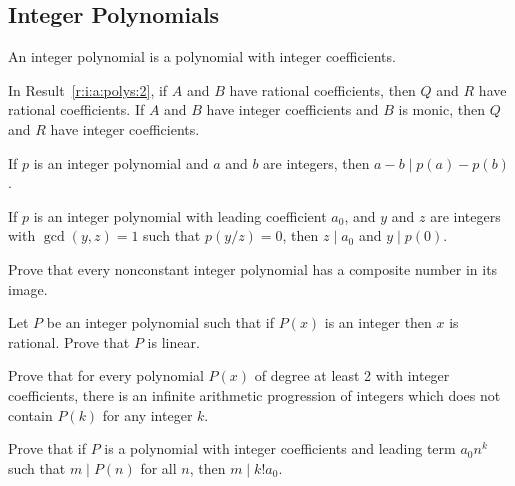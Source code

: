 \subsection{Integer Polynomials}
An integer polynomial is a polynomial with integer coefficients.
\begin{result}{\label{r:i:n:p:1}}
    In Result~\ref{r:i:a:polys:2}, if $A$ and $B$ have rational coefficients,
    then $Q$ and $R$
    have rational coefficients. If $A$ and $B$ have integer coefficients and $B$
    is monic, then $Q$ and $R$ have integer coefficients.
\end{result}
\begin{result}{\label{r:i:n:p:2}}
    If $p$ is an integer polynomial and $a$ and $b$ are
    integers, then $a-b\mid p(a)-p(b)$.
\end{result}
\begin{result}{\label{r:i:n:p:3}}
  If $p$ is an integer polynomial with leading coefficient $a_0$,
  and $y$ and $z$ are integers with $\gcd(y,z)=1$
    such that $p(y/z)=0$, then $z\mid a_0$ and $y\mid p(0)$.
\end{result}
\begin{problem}{\label{p:i:n:p:1}}
  Prove that every nonconstant integer polynomial has a composite number
    in its image.
\end{problem}
\begin{problem}{\label{p:i:n:p:2}}
  Let $P$ be an integer polynomial such that if $P(x)$ is an integer then
    $x$ is rational. Prove that $P$ is linear.
\end{problem}
\begin{problem}{\label{p:i:n:p:3}}
  Prove that for every polynomial $P(x)$ of degree at least 2 with integer
    coefficients, there is an infinite arithmetic
    progression of integers which does not contain $P(k)$ for any integer $k$.
\end{problem}
\begin{problem}{\label{p:i:n:p:4}}
  Prove that if $P$ is a polynomial with integer coefficients and leading term $a_0n^k$ such
    that $m\mid P(n)$ for all $n$, then $m\mid k!a_0$.
\end{problem}
